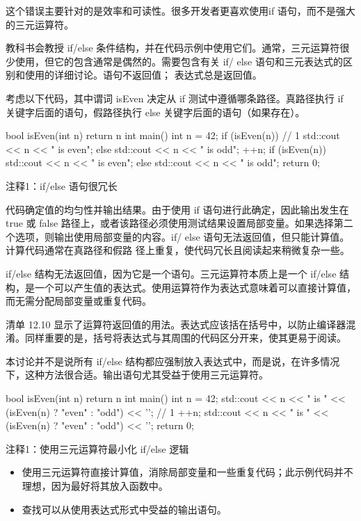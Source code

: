 这个错误主要针对的是效率和可读性。很多开发者更喜欢使用if 语句，而不是强大的三元运算符。


教科书会教授 if/else 条件结构，并在代码示例中使用它们。通常，三元运算符很少使用，但它的包含通常是偶然的。需要包含有关 if/ else 语句和三元表达式的区别和使用的详细讨论。语句不返回值； 表达式总是返回值。

考虑以下代码，其中谓词 isEven 决定从 if 测试中遵循哪条路径。真路径执行 if 关键字后面的语句，假路径执行 else 关键字后面的语句（如果存在）。


\begin{cpp}
bool isEven(int n) {
  return n %
}
int main() {
  int n = 42;
  if (isEven(n)) // 1
    std::cout << n << " is even\n";
  else
    std::cout << n << " is odd\n";
  ++n;
  if (isEven(n))
    std::cout << n << " is even\n";
  else
    std::cout << n << " is odd\n";
  return 0;
}
\end{cpp}

{\footnotesize
注释1：if/else 语句很冗长
}


代码确定值的均匀性并输出结果。由于使用 if 语句进行此确定，因此输出发生在 true 或 false 路径上，或者该路径必须使用测试结果设置局部变量。如果选择第二个选项，则输出使用局部变量的内容。if/ else 语句无法返回值，但只能计算值。计算代码通常在真路径和假路 径上重复，使代码冗长且阅读起来稍微复杂一些。


if/else 结构无法返回值，因为它是一个语句。三元运算符本质上是一个 if/else 结构，是一个可以产生值的表达式。使用运算符作为表达式意味着可以直接计算值，而无需分配局部变量或重复代码。

清单 12.10 显示了运算符返回值的用法。表达式应该括在括号中，以防止编译器混淆。同样重要的是，括号将表达式与其周围的代码区分开来，使其更易于阅读。

本讨论并不是说所有 if/else 结构都应强制放入表达式中，而是说，在许多情况下，这种方法很合适。输出语句尤其受益于使用三元运算符。


\begin{cpp}
bool isEven(int n) {
  return n %
}
int main() {
  int n = 42;
  std::cout << n << " is " << (isEven(n) ? "even" : "odd") << '\n'; // 1
  ++n;
  std::cout << n << " is " << (isEven(n) ? "even" : "odd") << '\n';
  return 0;
}
\end{cpp}

{\footnotesize
注释1：使用三元运算符最小化 if/else 逻辑
}


\begin{itemize}
\item
使用三元运算符直接计算值，消除局部变量和一些重复代码；此示例代码并不理想，因为最好将其放入函数中。

\item
查找可以从使用表达式形式中受益的输出语句。
\end{itemize}
